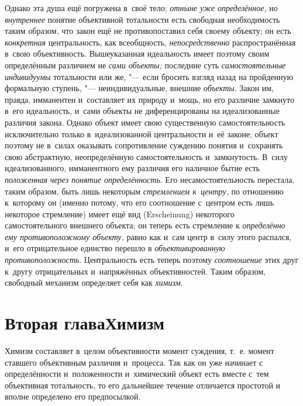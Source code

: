 
Однако эта душа ещё погружена в~своё тело;
{\em отныне уже определённое,}
но {\em внутреннее}
понятие объективной тотальности есть свободная необходимость
таким образом, что закон ещё не противопоставил себя своему объекту; он
есть {\em конкретная}
центральность, как всеобщность,
{\em непосредственно}
распространённая в~свою объективность. Вышеуказанная
идеальность имеет поэтому своим определённым различием не
{\em сами объекты;}
последние суть
{\em самостоятельные индивидуумы}
тотальности или же, "--- если бросить взгляд
назад на пройденную формальную ступень, "--- неиндивидуальные,
внешние {\em объекты}.
Закон им, правда, имманентен и~составляет их природу и~мощь,
но его различие замкнуто в~его идеальность, и~сами объекты не
диференцированы на идеализованные различия закона. Однако объект имеет свою
существенную самостоятельность исключительно только в~идеализованной
центральности и~её законе; объект поэтому не в~силах оказывать
сопротивление суждению понятия и~сохранять свою абстрактную, неопределённую
самостоятельность и~замкнутость. В~силу идеализованного, имманентного ему
различия его наличное бытие есть
{\em положенная}
{\em через понятие определённость}.
Его несамостоятельность перестала, таким образом, быть лишь
некоторым {\em стремлением к~центру,}
по отношению к~которому он (именно потому, что его
соотношение с~центром есть лишь некоторое стремление) имеет ещё вид
(Erscheinung) некоторого самостоятельного внешнего объекта;
он теперь есть стремление к
{\em определённо ему противоположному
объекту,} равно как и~сам центр в~силу этого распался, и~его
отрицательное единство перешло в
{\em объективированную
противоположность}. Центральность есть теперь
поэтому
{\em соотношение} этих
друг к~другу отрицательных и~напряжённых объективностей. Таким образом,
свободный механизм определяет себя как
{\em химизм}.

\chapter[Вторая глава Химизм]{Вторая глава\newline Химизм}

Химизм составляет в~целом объективности момент суждения, т.~е.
момент ставшего объективным различия и~процесса. Так как он уже начинает с
определённости и~положенности и~химический объект есть вместе с~тем
объективная тотальность, то его дальнейшее течение отличается простотой и
вполне определено его предпосылкой.

